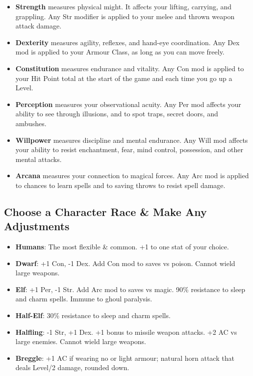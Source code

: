 \documentclass{book}
\providecommand{\tightlist}{%
\setlength{\itemsep}{0pt}\setlength{\parskip}{0pt}}
\begin{document}
\begin{itemize}
\tightlist
\item
  \textbf{Strength} measures physical might. It affects your lifting,
  carrying, and grappling. Any Str modifier is applied to your melee and
  thrown weapon attack damage.
\item
  \textbf{Dexterity} measures agility, reflexes, and hand-eye
  coordination. Any Dex mod is applied to your Armour Class, as long as
  you can move freely.
\item
  \textbf{Constitution} measures endurance and vitality. Any Con mod is
  applied to your Hit Point total at the start of the game and each time
  you go up a Level.
\item
  \textbf{Perception} measures your observational acuity. Any Per mod
  affects your ability to see through illusions, and to spot traps,
  secret doors, and ambushes.
\item
  \textbf{Willpower} measures discipline and mental endurance. Any Will
  mod affects your ability to resist enchantment, fear, mind control,
  possession, and other mental attacks.
\item
  \textbf{Arcana} measures your connection to magical forces. Any Arc
  mod is applied to chances to learn spells and to saving throws to
  resist spell damage.
\end{itemize}

\subsection*{Choose a Character Race \& Make Any
Adjustments}\label{choose-a-character-race-make-any-adjustments}

\begin{itemize}
\tightlist
\item
  \textbf{Humans}: The most flexible \& common. +1 to one stat of your
  choice.
\item
  \textbf{Dwarf}: +1 Con, -1 Dex. Add Con mod to saves vs poison. Cannot
  wield large weapons.
\item
  \textbf{Elf}: +1 Per, -1 Str. Add Arc mod to saves vs magic. 90\%
  resistance to sleep and charm spells. Immune to ghoul paralysis.
\item
  \textbf{Half-Elf}: 30\% resistance to sleep and charm spells.
\item
  \textbf{Halfling}: -1 Str, +1 Dex. +1 bonus to missile weapon attacks.
  +2 AC vs large enemies. Cannot wield large weapons.
\item
  \textbf{Breggle}: +1 AC if wearing no or light armour; natural horn
  attack that deals Level/2 damage, rounded down.
\end{itemize}
\end{document}
